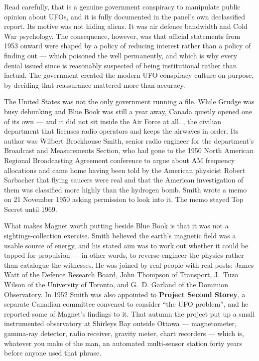 Read carefully, that is a genuine government conspiracy to manipulate public opinion about
UFOs, and it is fully documented in the panel's own declassified report. Its motive was not
hiding aliens. It was air defence bandwidth and Cold War psychology. The consequence, however,
was that official statements from 1953 onward were shaped by a policy of reducing interest
rather than a policy of finding out --- which poisoned the well permanently, and which is why
every denial issued since is reasonably suspected of being institutional rather than factual.
The government created the modern UFO conspiracy culture on purpose, by deciding that
reassurance mattered more than accuracy.

The United States was not the only government running a file. While Grudge was busy debunking
and Blue Book was still a year away, Canada quietly opened one of its own --- and it did not
sit inside the Air Force at all. , the civilian department that licenses radio operators and keeps
the airwaves in order. Its author was Wilbert Brockhouse Smith, senior radio engineer for the
department's Broadcast and Measurements Section, who had gone to the 1950 North American
Regional Broadcasting Agreement conference to argue about AM frequency allocations and came home
having been told by the American physicist Robert Sarbacher that flying saucers were real and
that the American investigation of them was classified more highly than the hydrogen bomb.
Smith wrote a memo on 21 November 1950 asking permission to look into it. The memo stayed Top
Secret until 1969.

What makes Magnet worth putting beside Blue Book is that it was not a sightings-collection
exercise. Smith believed the earth's magnetic field was a usable source of energy, and his
stated aim was to work out whether it could be tapped for propulsion --- in other words, to
reverse-engineer the physics rather than catalogue the witnesses. He was joined by real people
with real posts: James Watt of the Defence Research Board, John Thompson of Transport, J.~Tuzo
Wilson of the University of Toronto, and G.~D. Garland of the Dominion Observatory. In 1952 Smith
was also appointed to \textbf{Project Second Storey}, a separate Canadian committee convened to
consider ``the UFO problem'', and he reported some of Magnet's findings to it. That autumn the
project put up a small instrumented observatory at Shirleys Bay outside Ottawa --- magnetometer,
gamma-ray detector, radio receiver, gravity meter, chart recorders --- which is, whatever you
make of the man, an automated multi-sensor station forty years before anyone used that phrase.


